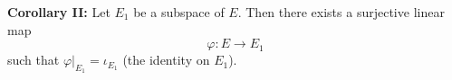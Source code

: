 \textbf{Corollary II:} Let $E_1$ be a subspace of $E$. Then there exists a surjective linear map
$$\varphi: E \to E_1$$
such that $\varphi|_{E_1} = \iota_{E_1}$ (the identity on $E_1$).
